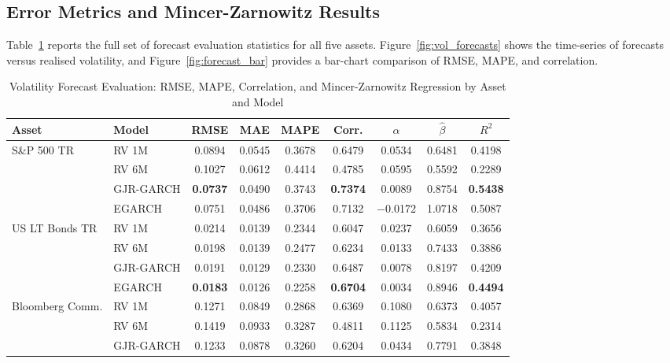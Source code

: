 \documentclass[12pt, a4paper]{article}
\begin{document}
\subsection{Error Metrics and Mincer-Zarnowitz Results}

Table~\ref{tab:mz} reports the full set of forecast evaluation statistics for all five
assets. Figure~\ref{fig:vol_forecasts} shows the time-series of forecasts versus realised
volatility, and Figure~\ref{fig:forecast_bar} provides a bar-chart comparison of RMSE,
MAPE, and correlation.

\begin{table}[H]
  \centering
  \caption{Volatility Forecast Evaluation: RMSE, MAPE, Correlation, and Mincer-Zarnowitz
           Regression by Asset and Model}
  \label{tab:mz}
  \footnotesize
  \begin{tabular}{llccccccc}
    \toprule
    \textbf{Asset} & \textbf{Model}
      & \textbf{RMSE} & \textbf{MAE} & \textbf{MAPE}
      & \textbf{Corr.} & {$\hat{\alpha}$} & {$\hat{\beta}$} & {$R^2$} \\
    \midrule
    \multirow{4}{*}{S\&P 500 TR}
      & RV 1M        & 0.0894 & 0.0545 & 0.3678 & 0.6479 &  0.0534 & 0.6481 & 0.4198 \\
      & RV 6M        & 0.1027 & 0.0612 & 0.4414 & 0.4785 &  0.0595 & 0.5592 & 0.2289 \\
      & GJR-GARCH    & \bfseries 0.0737 & 0.0490 & 0.3743 & \bfseries 0.7374 &  0.0089 & 0.8754 & \bfseries 0.5438 \\
      & EGARCH       & 0.0751 & 0.0486 & 0.3706 & 0.7132 & {$-$0.0172} & 1.0718 & 0.5087 \\
    \midrule
    \multirow{4}{*}{US LT Bonds TR}
      & RV 1M        & 0.0214 & 0.0139 & 0.2344 & 0.6047 & 0.0237 & 0.6059 & 0.3656 \\
      & RV 6M        & 0.0198 & 0.0139 & 0.2477 & 0.6234 & 0.0133 & 0.7433 & 0.3886 \\
      & GJR-GARCH    & 0.0191 & 0.0129 & 0.2330 & 0.6487 & 0.0078 & 0.8197 & 0.4209 \\
      & EGARCH       & \bfseries 0.0183 & 0.0126 & 0.2258 & \bfseries 0.6704 & 0.0034 & 0.8946 & \bfseries 0.4494 \\
    \midrule
    \multirow{4}{*}{Bloomberg Comm.}
      & RV 1M        & 0.1271 & 0.0849 & 0.2868 & 0.6369 & 0.1080 & 0.6373 & 0.4057 \\
      & RV 6M        & 0.1419 & 0.0933 & 0.3287 & 0.4811 & 0.1125 & 0.5834 & 0.2314 \\
      & GJR-GARCH    & 0.1233 & 0.0878 & 0.3260 & 0.6204 & 0.0434 & 0.7791 & 0.3848 \\

\end{tabular}
\end{table}
\end{document}
